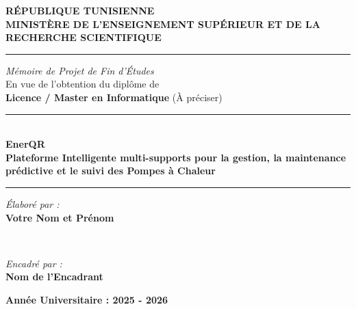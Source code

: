 \documentclass[12pt, a4paper, twoside]{report}
\begin{document}
\begin{titlepage}
    \begin{center}
        \vspace*{1cm}
        
        \Large \textbf{RÉPUBLIQUE TUNISIENNE}\\
        \Large \textbf{MINISTÈRE DE L'ENSEIGNEMENT SUPÉRIEUR ET DE LA RECHERCHE SCIENTIFIQUE}\\
        
        \vspace{1.5cm}
        
        \rule{0.4\textwidth}{0.4pt} %
        
        \vspace{2cm}
        
        \Large \textit{Mémoire de Projet de Fin d'Études}\\
        \normalsize En vue de l'obtention du diplôme de\\
        \textbf{Licence / Master en Informatique} (À préciser)
        
        \vspace{2cm}
        
        \rule{\linewidth}{0.5mm} \\[0.4cm]
        {\huge \bfseries \textcolor{EnerQRDarkBlue}{Ener}\textcolor{EnerQRGreen}{QR}} \\[0.4cm]
        {\Large \textbf{Plateforme Intelligente multi-supports pour la gestion, la maintenance prédictive et le suivi des Pompes à Chaleur}} \\[0.4cm]
        \rule{\linewidth}{0.5mm}
        
        \vspace{2cm}
        
        \begin{minipage}{0.4\textwidth}
            \begin{flushleft} \large
                \emph{Élaboré par :}\\
                \textbf{Votre Nom et Prénom}
            \end{flushleft}
        \end{minipage}
        ~
        \begin{minipage}{0.4\textwidth}
            \begin{flushright} \large
                \emph{Encadré par :}\\
                \textbf{Nom de l'Encadrant}
            \end{flushright}
        \end{minipage}
        
        \vfill
        
        \large \textbf{Année Universitaire : 2025 - 2026}
        
    \end{center}
\end{titlepage}
\end{document}
